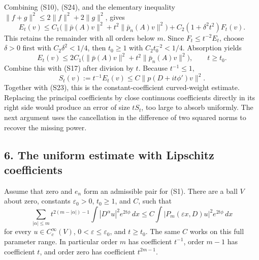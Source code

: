 \documentclass[
  11pt,
]{article}
\makeatletter
\let\ReaderOriginalAnchorStart\hyper@anchorstart
\let\ReaderOriginalAnchorEnd\hyper@anchorend
\let\ReaderPendingAliases\@empty
\def\ReaderArmAliases#1{\gdef\ReaderPendingAliases{#1}}
\def\hyper@anchorstart#1{\ReaderIfNativeAnchorTF{#1}{\ReaderPendingAliases\global\let\ReaderPendingAliases\@empty}{}\ReaderOriginalAnchorStart{#1}}
\makeatother
\begin{document}
Combining (S10), (S24), and the elementary inequality
\(\|f+g\|^2\leq2\|f\|^2+2\|g\|^2\), gives \[
 E_t(v)\leq C_1\bigl(\|\bar p(A)v\|^2+
                      t^2\|\bar p_n(A)v\|^2\bigr)
       +C_2(1+\delta^2t^2)F_t(v).                                \tag{S25}
\] This retains the remainder with all orders below \(m\). Since
\(F_t\leq t^{-2}E_t\), choose \(\delta>0\) first with
\(C_2\delta^2<1/4\), then \(t_0\geq1\) with \(C_2t_0^{-2}<1/4\).
Absorption yields \[
 E_t(v)\leq 2C_1\bigl(\|\bar p(A)v\|^2+
                       t^2\|\bar p_n(A)v\|^2\bigr),\qquad t\geq t_0.
                                                                    \tag{S26}
\] Combine this with (S17) after division by \(t\). Because
\(t^{-1}\leq1\), \[
 S_t(v):=t^{-1}E_t(v)
 \leq C\|p(D+it\phi')v\|^2.                                     \tag{S27}
\] Together with (S23), this is the constant-coefficient curved-weight
estimate. Replacing the principal coefficients by close continuous
coefficients directly in its right side would produce an error of size
\(tS_t\), too large to absorb uniformly. The next argument uses the
cancellation in the difference of two squared norms to recover the
missing power.

\ReaderArmAliases{\ReaderOriginalAnchorStart{AN03-SUC-006}\ReaderOriginalAnchorEnd\begingroup\expandafter\def\csname @currentHref\endcsname{AN03-SUC-006}\label{AN03-SUC-006}\endgroup\ReaderOriginalAnchorStart{an03-suc-006-the-uniform-estimate-with-lipschitz-coefficients}\ReaderOriginalAnchorEnd\begingroup\expandafter\def\csname @currentHref\endcsname{an03-suc-006-the-uniform-estimate-with-lipschitz-coefficients}\label{an03-suc-006-the-uniform-estimate-with-lipschitz-coefficients}\endgroup\ReaderOriginalAnchorStart{6-the-uniform-estimate-with-lipschitz-coefficients}\ReaderOriginalAnchorEnd\begingroup\expandafter\def\csname @currentHref\endcsname{6-the-uniform-estimate-with-lipschitz-coefficients}\label{6-the-uniform-estimate-with-lipschitz-coefficients}\endgroup\ReaderOriginalAnchorStart{the-uniform-estimate-with-lipschitz-coefficients}\ReaderOriginalAnchorEnd}
\subsection{6. The uniform estimate with Lipschitz
coefficients}\label{the-uniform-estimate-with-lipschitz-coefficients}

Assume that zero and \(e_n\) form an admissible pair for (S1). There are
a ball \(V\) about zero, constants \(\varepsilon_0>0\), \(t_0\geq1\),
and \(C\), such that \[
 \sum_{|\alpha|\leq m}t^{2(m-|\alpha|)-1}
       \int|D^\alpha u|^2e^{2t\phi}\,dx
 \leq C\int|P_m(\varepsilon x,D)u|^2e^{2t\phi}\,dx                \tag{S28}
\] for every \(u\in C_c^\infty(V)\), \(0<\varepsilon\leq\varepsilon_0\),
and \(t\geq t_0\). The same \(C\) works on this full parameter range. In
particular order \(m\) has coefficient \(t^{-1}\), order \(m-1\) has
coefficient \(t\), and order zero has coefficient \(t^{2m-1}\).
\end{document}
